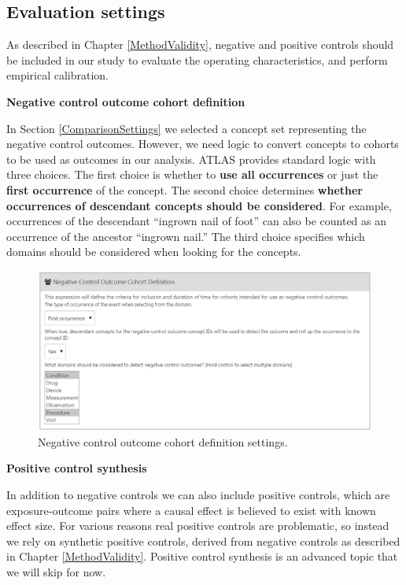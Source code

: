 \documentclass[11pt]{book}
\theoremstyle{definition}
\theoremstyle{definition}
\theoremstyle{definition}
\theoremstyle{remark}
\begin{document}
\hypertarget{evaluationSettings}{%
\subsection{Evaluation settings}\label{evaluationSettings}}

As described in Chapter \ref{MethodValidity}, negative and positive controls should be included in our study to evaluate the operating characteristics, and perform empirical calibration.

\textbf{Negative control outcome cohort definition}

In Section \ref{ComparisonSettings} we selected a concept set representing the negative control outcomes. However, we need logic to convert concepts to cohorts to be used as outcomes in our analysis. ATLAS provides standard logic with three choices. The first choice is whether to \textbf{use all occurrences} or just the \textbf{first occurrence} of the concept. The second choice determines \textbf{whether occurrences of descendant concepts should be considered}. For example, occurrences of the descendant ``ingrown nail of foot'' can also be counted as an occurrence of the ancestor ``ingrown nail.'' The third choice specifies which domains should be considered when looking for the concepts.

\begin{figure}

{\centering \includegraphics[width=1\linewidth]{images/PopulationLevelEstimation/ncSettings} 

}

\caption{Negative control outcome cohort definition settings.}\label{fig:ncSettings}
\end{figure}

\textbf{Positive control synthesis}

In addition to negative controls we can also include positive controls, which are exposure-outcome pairs where a causal effect is believed to exist with known effect size. For various reasons real positive controls are problematic, so instead we rely on synthetic positive controls, derived from negative controls as described in Chapter \ref{MethodValidity}. Positive control synthesis is an advanced topic that we will skip for now.
\end{document}
